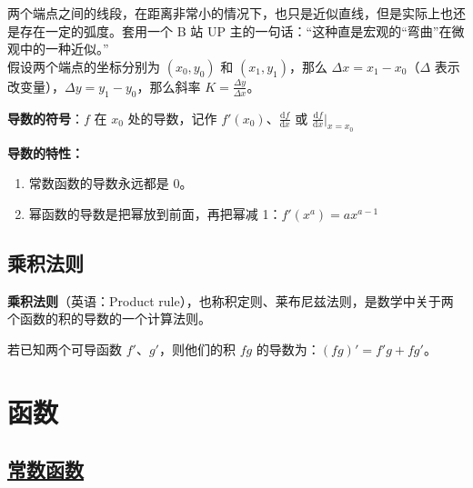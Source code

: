 两个端点之间的线段，在距离非常小的情况下，也只是近似直线，但是实际上也还是存在一定的弧度。套用一个 B 站 UP 主的一句话：“这种直是宏观的“弯曲”在微观中的一种近似。”\\
假设两个端点的坐标分别为 $(x_0, y_0)$ 和 $(x_1, y_1)$，那么 $\Delta x = x_1 - x_0$（$\Delta$ 表示改变量），$\Delta y = y_1 - y_0$，那么斜率 $K = \frac{\Delta y}{\Delta x}$。

\begin{center}
\end{center}

\textbf{导数的符号}：$f$ 在 $x_0$ 处的导数，记作 $f'(x_0)$、$\frac{\mathrm{d}f}{\mathrm{d}x}$ 或 $\frac{\mathrm{d}f}{\mathrm{d}x}|_{x=x_0}$

\textbf{导数的特性：}

\begin{enumerate}
    \item 常数函数的导数永远都是 0。
    \item 幂函数的导数是把幂放到前面，再把幂减 1：$f'(x^a) = ax^{a-1}$
\end{enumerate}

\subsection{乘积法则}

\textbf{乘积法则}（英语：Product rule），也称积定则、莱布尼兹法则，是数学中关于两个函数的积的导数的一个计算法则。

若已知两个可导函数 $f'$、$g'$，则他们的积 $fg$ 的导数为：$(fg)' = f'g + fg'$。

\clearpage
\section{函数}

\subsection{\href{https://zh.wikipedia.org/wiki/\%E5\%B8\%B8\%E6\%95\%B8\%E5\%87\%BD\%E6\%95\%B8}{常数函数}}

